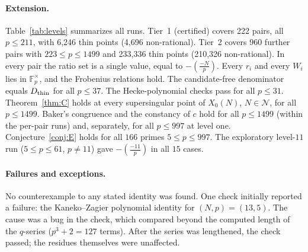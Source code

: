 \documentclass[11pt,a4paper]{article}
\numberwithin{equation}{section}
\theoremstyle{definition}
\theoremstyle{remark}
\newcommand{\Fp}{\mathbb F_p}
\newcommand{\leg}[2]{\left(\frac{#1}{#2}\right)}
\newcommand{\Lp}[1]{\left(\frac{#1}{p}\right)}
\begin{document}
\paragraph{Extension.} Table~\ref{tab:levels} summarizes all runs. Tier~1 (certified) covers
222 pairs, all $p\le 211$, with 6{,}246 thin points (4{,}696 non-rational). Tier~2 covers
960 further pairs with $223\le p\le 1499$ and 233{,}336 thin points (210{,}326 non-rational). In every pair the ratio
set is a single value, equal to $-\Lp{-N}$. Every $r_i$ and every $W_i$ lies in $\Fp^\times$, and
the Frobenius relations hold. The candidate-free denominator equals $D_{\rm thin}$ for all $p\le37$.
The Hecke-polynomial checks pass for all $p\le31$. Theorem~\ref{thm:C} holds at every supersingular
point of $X_0(N)$, $N\in\mathcal N$, for all $p\le 1499$. Baker's congruence and the constancy of $c$ hold for all $p\le 1499$
(within the per-pair runs) and, separately, for all $p\le997$ at level one. Conjecture~\ref{conj:E} holds for all $166$
primes $5\le p\le997$. The exploratory level-$11$ run ($5\le p\le61$, $p\ne11$) gave $-\leg{-11}{p}$ in all $15$ cases.

\paragraph{Failures and exceptions.} No counterexample to any stated identity was found. One check
initially reported a failure: the Kaneko--Zagier polynomial identity for $(N,p)=(13,5)$. The cause was a bug in the check, which compared beyond the
computed length of the $q$-series ($p^3+2=127$ terms). After the series was
lengthened, the check passed; the residues themselves were unaffected.
\end{document}
